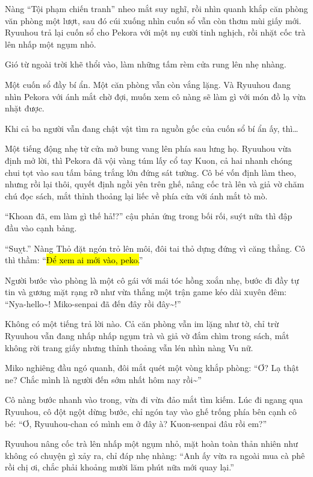 \documentclass[../main.tex]{subfiles}
\begin{document}
Nàng ``Tội phạm chiến tranh'' nheo mắt suy nghĩ, rồi nhìn quanh khắp căn phòng văn phòng một lượt, sau đó cúi xuống nhìn cuốn sổ vẫn còn thơm mùi giấy mới. Ryuuhou trả lại cuốn sổ cho Pekora với một nụ cười tinh nghịch, rồi nhặt cốc trà lên nhấp một ngụm nhỏ.

Gió từ ngoài trời khẽ thổi vào, làm những tấm rèm cửa rung lên nhẹ nhàng.

Một cuốn sổ đầy bí ẩn. Một căn phòng vẫn còn vắng lặng. Và Ryuuhou đang nhìn Pekora với ánh mắt chờ đợi, muốn xem cô nàng sẽ làm gì với món đồ lạ vừa nhặt được.

Khi cả ba người vẫn đang chật vật tìm ra nguồn gốc của cuốn sổ bí ẩn ấy, thì\dots

Một tiếng động nhẹ từ cửa mở bung vang lên phía sau lưng họ. Ryuuhou vừa định mở lời, thì Pekora đã vội vàng túm lấy cổ tay Kuon, cả hai nhanh chóng chui tọt vào sau tấm bảng trắng lớn đứng sát tường. Cô bé vốn định làm theo, nhưng rồi lại thôi, quyết định ngồi yên trên ghế, nâng cốc trà lên và giả vờ chăm chú đọc sách, mắt thỉnh thoảng lại liếc về phía cửa với ánh mắt tò mò.

``Khoan đã, em làm gì thế hả!?'' cậu phản ứng trong bối rối, suýt nữa thì đập đầu vào cạnh bảng.

``Suỵt.'' Nàng Thỏ đặt ngón trỏ lên môi, đôi tai thỏ dựng đứng vì căng thẳng. Cô thì thầm: ``\hl{Để xem ai mới vào, peko.}''

Người bước vào phòng là một cô gái với mái tóc hồng xoắn nhẹ, bước đi đầy tự tin và gương mặt rạng rỡ như vừa thắng một trận game kéo dài xuyên đêm: ``Nya-hello\~{}! Miko-senpai đã đến đây rồi đây\~{}!''

Không có một tiếng trả lời nào. Cả căn phòng vẫn im lặng như tờ, chỉ trừ Ryuuhou vẫn đang nhấp nhấp ngụm trà và giả vờ đắm chìm trong sách, mắt không rời trang giấy nhưng thỉnh thoảng vẫn lén nhìn nàng Vu nữ.


Miko nghiêng đầu ngó quanh, đôi mắt quét một vòng khắp phòng: ``Ơ? Lạ thật ne? Chắc mình là người đến sớm nhất hôm nay rồi\~{}''

Cô nàng bước nhanh vào trong, vừa đi vừa đảo mắt tìm kiếm. Lúc đi ngang qua Ryuuhou, cô đột ngột dừng bước, chỉ ngón tay vào ghế trống phía bên cạnh cô bé: ``Ơ, Ryuuhou-chan có mình em ở đây à? Kuon-senpai đâu rồi em?''

Ryuuhou nâng cốc trà lên nhấp một ngụm nhỏ, mặt hoàn toàn thản nhiên như không có chuyện gì xảy ra, chỉ đáp nhẹ nhàng: ``Anh ấy vừa ra ngoài mua cà phê rồi chị ơi, chắc phải khoảng mười lăm phút nữa mới quay lại.''
\end{document}
